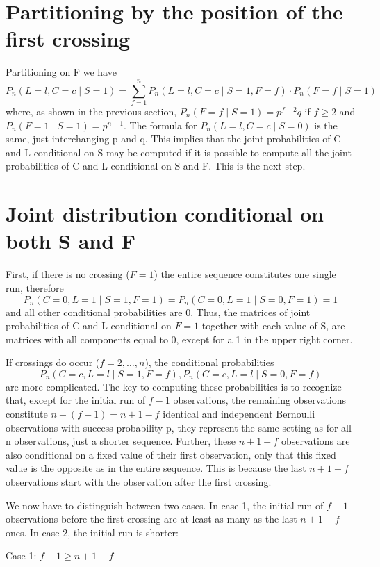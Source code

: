 \section{Partitioning by the position of the first crossing}

Partitioning on  F we have $$P_n (L=l,C=c \mid S=1) = \sum_{f=1}^n P_n(L=l,C=c \mid S=1,F=f) \cdot P_n (F=f \mid S=1)$$
where, as shown in the previous section,  $P_n (F=f \mid S=1) =p^{f-2}q$ if $f \geq 2$ and $P_n (F=1 \mid S=1) = p^{n-1}$. The formula for $P_n (L=l,C=c \mid S=0)$ is the same, just interchanging p and q. This implies that the joint probabilities of C and L conditional on S may be computed if it is possible to compute all the joint probabilities of C and L conditional on S and F. This is the next step.

\section{Joint distribution conditional on both S and F}

First, if there is no crossing ($F=1$) the entire sequence constitutes one single run, therefore $$P_n (C=0,L=1 \mid S=1,F=1)=P_n (C=0,L=1 \mid S=0,F=1)=1$$
and all other conditional probabilities are 0. Thus, the matrices of joint probabilities of C and L conditional on $F=1$ together with each value of S, are matrices with all components equal to 0, except for a 1 in the upper right corner.

If crossings do occur ($f=2, \ldots ,n$), the conditional probabilities $$P_n (C=c,L=l \mid S=1,F=f), P_n (C=c,L=l \mid S=0,F=f)$$ are more complicated. The key to computing these probabilities is to recognize that, except for the initial run of $f-1$ observations, the remaining observations constitute $n-(f-1)=n+1-f$ identical and independent Bernoulli observations with success probability p, they represent the same setting as for all n observations, just a shorter sequence. Further, these $n+1-f$ observations are also conditional on a fixed value of their first observation, only that this fixed value is the opposite as in the entire sequence. This is because the last $n+1-f$ observations start with the  observation after the first crossing. 

We now have to distinguish between two cases. In case 1, the initial run of $f-1$ observations before the first crossing are at least as many as the last $n+1-f$ ones. In case 2, the initial run is shorter:

Case 1: $f-1 \geq n+1-f$

